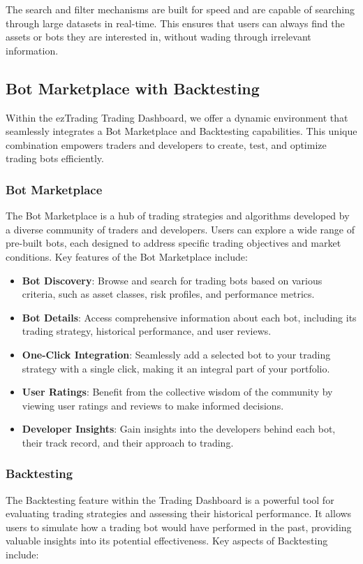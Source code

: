 The search and filter mechanisms are built for speed and are capable of searching through large datasets in real-time. This ensures that users can always find the assets or bots they are interested in, without wading through irrelevant information.

\subsection{Bot Marketplace with Backtesting}
\label{sec:marketplace}
Within the ezTrading Trading Dashboard, we offer a dynamic environment that seamlessly integrates a Bot Marketplace and Backtesting capabilities. This unique combination empowers traders and developers to create, test, and optimize trading bots efficiently.

\subsubsection{Bot Marketplace}
The Bot Marketplace is a hub of trading strategies and algorithms developed by a diverse community of traders and developers. Users can explore a wide range of pre-built bots, each designed to address specific trading objectives and market conditions. Key features of the Bot Marketplace include:

\begin{itemize}
  \item \textbf{Bot Discovery}: Browse and search for trading bots based on various criteria, such as asset classes, risk profiles, and performance metrics.
  \item \textbf{Bot Details}: Access comprehensive information about each bot, including its trading strategy, historical performance, and user reviews.
  \item \textbf{One-Click Integration}: Seamlessly add a selected bot to your trading strategy with a single click, making it an integral part of your portfolio.
  \item \textbf{User Ratings}: Benefit from the collective wisdom of the community by viewing user ratings and reviews to make informed decisions.
  \item \textbf{Developer Insights}: Gain insights into the developers behind each bot, their track record, and their approach to trading.
\end{itemize}

\subsubsection{Backtesting}
The Backtesting feature within the Trading Dashboard is a powerful tool for evaluating trading strategies and assessing their historical performance. It allows users to simulate how a trading bot would have performed in the past, providing valuable insights into its potential effectiveness. Key aspects of Backtesting include:

